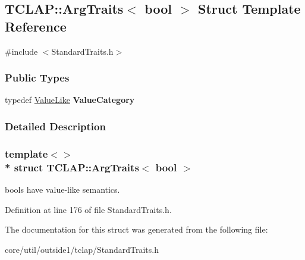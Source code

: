 \hypertarget{structTCLAP_1_1ArgTraits_3_01bool_01_4}{}\subsection{T\+C\+L\+AP\+:\+:Arg\+Traits$<$ bool $>$ Struct Template Reference}
\label{structTCLAP_1_1ArgTraits_3_01bool_01_4}


{\ttfamily \#include $<$Standard\+Traits.\+h$>$}

\subsubsection*{Public Types}
\begin{DoxyCompactItemize}
\item 
typedef \hyperlink{structTCLAP_1_1ValueLike}{Value\+Like} {\bfseries Value\+Category}\hypertarget{structTCLAP_1_1ArgTraits_3_01bool_01_4_a86efe13e981aaef96d37ec465a8409a7}{}\label{structTCLAP_1_1ArgTraits_3_01bool_01_4_a86efe13e981aaef96d37ec465a8409a7}

\end{DoxyCompactItemize}


\subsubsection{Detailed Description}
\subsubsection*{template$<$$>$\\*
struct T\+C\+L\+A\+P\+::\+Arg\+Traits$<$ bool $>$}

bools have value-\/like semantics. 

Definition at line 176 of file Standard\+Traits.\+h.



The documentation for this struct was generated from the following file\+:\begin{DoxyCompactItemize}
\item 
core/util/outside1/tclap/Standard\+Traits.\+h\end{DoxyCompactItemize}
